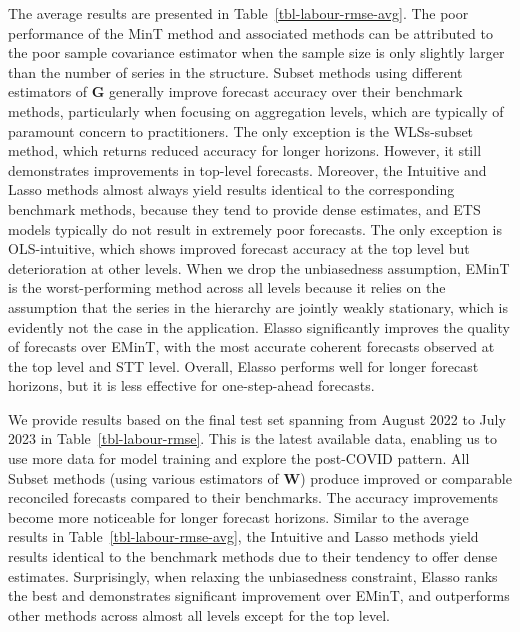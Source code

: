 \documentclass[
  11pt]{article}
\theoremstyle{plain}
\theoremstyle{remark}
\begin{document}
The average results are presented in Table~\ref{tbl-labour-rmse-avg}.
The poor performance of the MinT method and associated methods can be
attributed to the poor sample covariance estimator when the sample size
is only slightly larger than the number of series in the structure.
Subset methods using different estimators of \(\bm{G}\) generally
improve forecast accuracy over their benchmark methods, particularly
when focusing on aggregation levels, which are typically of paramount
concern to practitioners. The only exception is the WLSs-subset method,
which returns reduced accuracy for longer horizons. However, it still
demonstrates improvements in top-level forecasts. Moreover, the
Intuitive and Lasso methods almost always yield results identical to the
corresponding benchmark methods, because they tend to provide dense
estimates, and ETS models typically do not result in extremely poor
forecasts. The only exception is OLS-intuitive, which shows improved
forecast accuracy at the top level but deterioration at other levels.
When we drop the unbiasedness assumption, EMinT is the worst-performing
method across all levels because it relies on the assumption that the
series in the hierarchy are jointly weakly stationary, which is
evidently not the case in the application. Elasso significantly improves
the quality of forecasts over EMinT, with the most accurate coherent
forecasts observed at the top level and STT level. Overall, Elasso
performs well for longer forecast horizons, but it is less effective for
one-step-ahead forecasts.

We provide results based on the final test set spanning from August 2022
to July 2023 in Table~\ref{tbl-labour-rmse}. This is the latest
available data, enabling us to use more data for model training and
explore the post-COVID pattern. All Subset methods (using various
estimators of \(\bm{W}\)) produce improved or comparable reconciled
forecasts compared to their benchmarks. The accuracy improvements become
more noticeable for longer forecast horizons. Similar to the average
results in Table~\ref{tbl-labour-rmse-avg}, the Intuitive and Lasso
methods yield results identical to the benchmark methods due to their
tendency to offer dense estimates. Surprisingly, when relaxing the
unbiasedness constraint, Elasso ranks the best and demonstrates
significant improvement over EMinT, and outperforms other methods across
almost all levels except for the top level.
\end{document}
